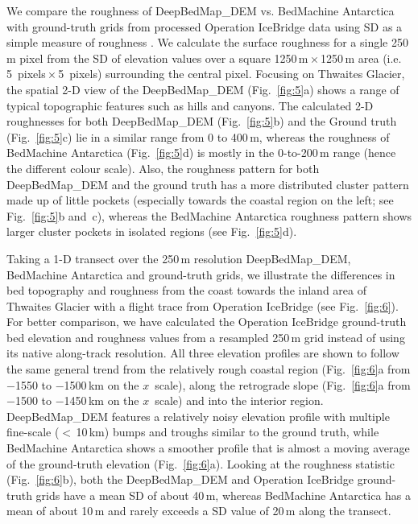 We compare the roughness of DeepBedMap\_DEM vs. BedMachine Antarctica with ground-truth grids from processed Operation IceBridge data \citep{ShiMultichannelCoherentRadar2010} using SD as a simple measure of roughness \citep{RippinBasalroughnessInstitute2014}.
We calculate the surface roughness for a single 250\,\unit{m} pixel from the SD of elevation values over a square 1250\,\unit{m}\,$\times$\,1250\,\unit{m} area (i.e. 5~\unit{pixels}\,$\times$\,5~\unit{pixels}) surrounding the central pixel.
Focusing on Thwaites Glacier, the spatial 2-D view of the DeepBedMap\_DEM (Fig.~\ref{fig:5}a) shows a range of typical topographic features such as hills and canyons.
The calculated 2-D roughnesses for both DeepBedMap\_DEM (Fig.~\ref{fig:5}b) and the Ground truth (Fig.~\ref{fig:5}c) lie in a similar range from 0 to 400\,\unit{m}, whereas the roughness of BedMachine Antarctica (Fig.~\ref{fig:5}d) is mostly in the 0-to-200\,\unit{m} range (hence the different colour scale).
Also, the roughness pattern for both DeepBedMap\_DEM and the ground truth has a more distributed cluster pattern made up of little pockets (especially towards the coastal region on the left; see Fig.~\ref{fig:5}b and~c), whereas the BedMachine Antarctica roughness pattern shows larger cluster pockets in isolated regions (see Fig.~\ref{fig:5}d).

Taking a 1-D transect over the 250\,\unit{m} resolution DeepBedMap\_DEM, BedMachine Antarctica and ground-truth grids, we illustrate the differences in bed topography and roughness from the coast towards the inland area of Thwaites Glacier with a flight trace from Operation IceBridge (see Fig.~\ref{fig:6}).
For better comparison, we have calculated the Operation IceBridge ground-truth bed elevation and roughness values from a resampled 250\,\unit{m} grid instead of using its native along-track resolution.
All three elevation profiles are shown to follow the same general trend from the relatively rough coastal region (Fig.~\ref{fig:6}a from $-$1550 to $-$1500\,\unit{km} on the $x$~scale), along the retrograde slope (Fig.~\ref{fig:6}a from $-$1500 to $-$1450\,\unit{km} on the $x$~scale) and into the interior region.
DeepBedMap\_DEM features a relatively noisy elevation profile with multiple fine-scale ($<$\,10\,\unit{km}) bumps and troughs similar to the ground truth, while BedMachine Antarctica shows a smoother profile that is almost a moving average of the ground-truth elevation (Fig.~\ref{fig:6}a).
Looking at the roughness statistic (Fig.~\ref{fig:6}b), both the DeepBedMap\_DEM and Operation IceBridge ground-truth grids have a mean SD of about 40\,\unit{m}, whereas BedMachine Antarctica has a mean of about 10\,\unit{m} and rarely exceeds a SD value of 20\,\unit{m} along the transect.

